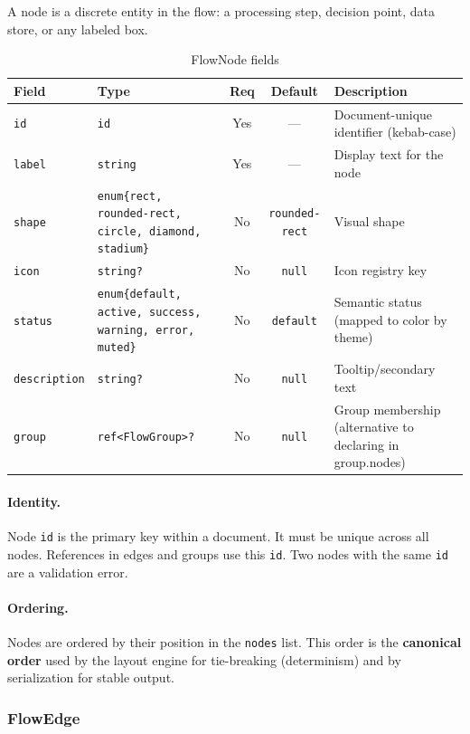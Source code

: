 A node is a discrete entity in the flow: a processing step, decision point, data store, or any labeled box.

\begin{table}[h]
\centering
\small
\begin{tabular}{llccp{4.5cm}}
\toprule
\textbf{Field} & \textbf{Type} & \textbf{Req} & \textbf{Default} & \textbf{Description} \\
\midrule
\texttt{id} & \texttt{id} & Yes & --- & Document-unique identifier (kebab-case) \\
\texttt{label} & \texttt{string} & Yes & --- & Display text for the node \\
\texttt{shape} & \texttt{enum\{rect, rounded-rect, circle, diamond, stadium\}} & No & \texttt{rounded-rect} & Visual shape \\
\texttt{icon} & \texttt{string?} & No & \texttt{null} & Icon registry key \\
\texttt{status} & \texttt{enum\{default, active, success, warning, error, muted\}} & No & \texttt{default} & Semantic status (mapped to color by theme) \\
\texttt{description} & \texttt{string?} & No & \texttt{null} & Tooltip/secondary text \\
\texttt{group} & \texttt{ref<FlowGroup>?} & No & \texttt{null} & Group membership (alternative to declaring in group.nodes) \\
\bottomrule
\end{tabular}
\caption{FlowNode fields}
\label{tab:flow-node-fields}
\end{table}

\paragraph{Identity.}
Node \texttt{id} is the primary key within a document. It must be unique across all nodes. References in edges and groups use this \texttt{id}. Two nodes with the same \texttt{id} are a validation error.

\paragraph{Ordering.}
Nodes are ordered by their position in the \texttt{nodes} list. This order is the \textbf{canonical order} used by the layout engine for tie-breaking (determinism) and by serialization for stable output.

\subsubsection{FlowEdge}
\label{sec:flow-edge}

